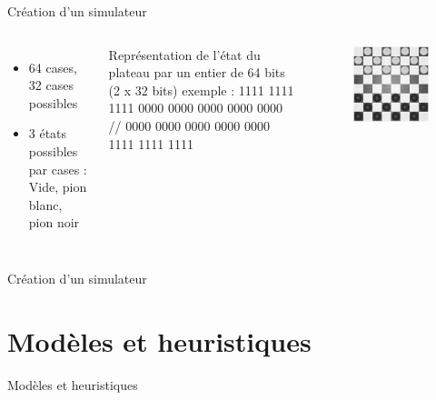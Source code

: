 \documentclass{beamer}
\begin{document}
\begin{frame}{Création d'un simulateur}
    \begin{columns}
        \begin{itemize}
            \item 64 cases, 32 cases possibles 
            \item 3 états possibles par cases :\newline
             Vide, pion blanc, pion noir
        \end{itemize}
        Représentation de l'état du plateau par un entier de 64 bits (\alert{2 x 32 bits})
        exemple : 1111 1111 1111 0000 0000 0000 0000 0000 //   0000 0000 0000 0000 0000 1111 1111 1111

        \begin{figure}
            \centering
            \includegraphics[width=\columnwidth]{im/dames2.png}
        \end{figure}
    \end{columns}
\end{frame}
\begin{frame}{Création d'un simulateur}
    
\end{frame}
{\section{Modèles et heuristiques}}
\begin{frame}{Modèles et heuristiques}
    
\end{frame}
\end{document}
